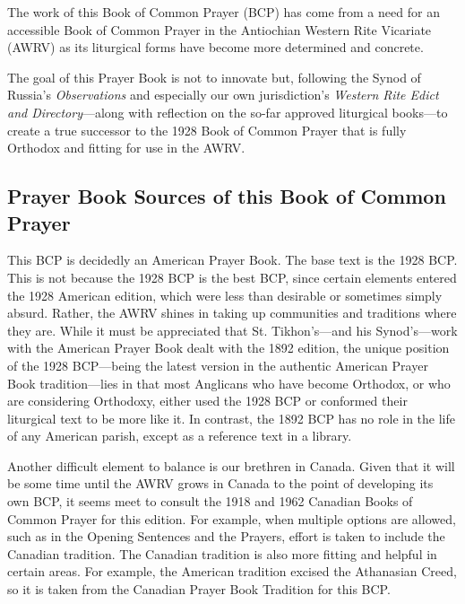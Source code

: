 {}
\noindent
The work of this Book of Common Prayer (BCP) has come from a need for an accessible Book of Common Prayer in the Antiochian Western Rite Vicariate (AWRV) as its liturgical forms have become more determined and concrete.

The goal of this Prayer Book is not to innovate but, following the Synod of Russia's \textit{Observations} and especially our own jurisdiction's \textit{Western Rite Edict and Directory}---along with reflection on the so-far approved liturgical books---to create a true successor to the 1928 Book of Common Prayer that is fully Orthodox and fitting for use in the AWRV.

\subsection{Prayer Book Sources of this Book of Common Prayer}\par\noindent
This BCP is decidedly an American Prayer Book. The base text is the 1928 BCP. This is not because the 1928 BCP is the best BCP, since certain elements entered the 1928 American edition, which were less than desirable or sometimes simply absurd. Rather, the AWRV shines in taking up communities and traditions where they are. While it must be appreciated that St. Tikhon's---and his Synod's---work with the American Prayer Book dealt with the 1892 edition, the unique position of the 1928 BCP---being the latest version in the authentic American Prayer Book tradition---lies in that most Anglicans who have become Orthodox, or who are considering Orthodoxy, either used the 1928 BCP or conformed their liturgical text to be more like it. In contrast, the 1892 BCP has no role in the life of any American parish, except as a reference text in a library.

Another difficult element to balance is our brethren in Canada. Given that it will be some time until the AWRV grows in Canada to the point of developing its own BCP, it seems meet to consult the 1918 and 1962 Canadian Books of Common Prayer for this edition. For example, when multiple options are allowed, such as in the Opening Sentences and the Prayers, effort is taken to include the Canadian tradition. The Canadian tradition is also more fitting and helpful in certain areas. For example, the American tradition excised the Athanasian Creed, so it is taken from the Canadian Prayer Book Tradition for this BCP.

